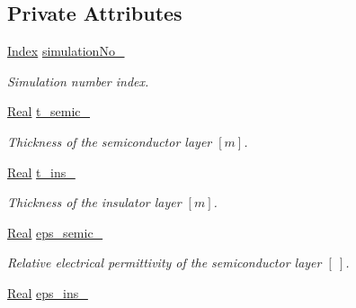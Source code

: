 \subsection*{Private Attributes}
\begin{DoxyCompactItemize}
\item 
\hypertarget{classParamList_a54962bcd38fdd7844045a1c93ce005fc}{\hyperlink{typedefs_8h_a2c726f8f32697958e9d6c2afecda531d}{Index} \hyperlink{classParamList_a54962bcd38fdd7844045a1c93ce005fc}{simulation\-No\-\_\-}}\label{classParamList_a54962bcd38fdd7844045a1c93ce005fc}

\begin{DoxyCompactList}\small\item\em Simulation number index. \end{DoxyCompactList}\item 
\hypertarget{classParamList_aeedc0268c6baa38b4821d85ad97d6f04}{\hyperlink{typedefs_8h_a060b837c3b4486ee35317744156f3da2}{Real} \hyperlink{classParamList_aeedc0268c6baa38b4821d85ad97d6f04}{t\-\_\-semic\-\_\-}}\label{classParamList_aeedc0268c6baa38b4821d85ad97d6f04}

\begin{DoxyCompactList}\small\item\em Thickness of the semiconductor layer $ \left[ m \right] $. \end{DoxyCompactList}\item 
\hypertarget{classParamList_a5a43783a68bb5ef04b797359a406fddf}{\hyperlink{typedefs_8h_a060b837c3b4486ee35317744156f3da2}{Real} \hyperlink{classParamList_a5a43783a68bb5ef04b797359a406fddf}{t\-\_\-ins\-\_\-}}\label{classParamList_a5a43783a68bb5ef04b797359a406fddf}

\begin{DoxyCompactList}\small\item\em Thickness of the insulator layer $ \left[ m \right] $. \end{DoxyCompactList}\item 
\hypertarget{classParamList_a1e07c6f98a0601cd91a3bf10a728f62a}{\hyperlink{typedefs_8h_a060b837c3b4486ee35317744156f3da2}{Real} \hyperlink{classParamList_a1e07c6f98a0601cd91a3bf10a728f62a}{eps\-\_\-semic\-\_\-}}\label{classParamList_a1e07c6f98a0601cd91a3bf10a728f62a}

\begin{DoxyCompactList}\small\item\em Relative electrical permittivity of the semiconductor layer $ \left[ ~ \right] $. \end{DoxyCompactList}\item 
\hypertarget{classParamList_a8955124ed7ee0cb116f343704478cac5}{\hyperlink{typedefs_8h_a060b837c3b4486ee35317744156f3da2}{Real} \hyperlink{classParamList_a8955124ed7ee0cb116f343704478cac5}{eps\-\_\-ins\-\_\-}}\label{classParamList_a8955124ed7ee0cb116f343704478cac5}


\end{DoxyCompactItemize}
